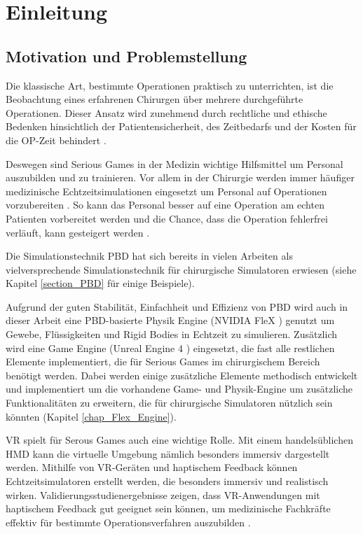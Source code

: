 \chapter{Einleitung}
\label{chap_Einleitung}



\section{Motivation und Problemstellung}


Die klassische Art, bestimmte Operationen praktisch zu unterrichten, ist die Beobachtung eines erfahrenen Chirurgen über mehrere durchgeführte Operationen. Dieser Ansatz wird zunehmend durch rechtliche und ethische Bedenken hinsichtlich der Patientensicherheit, des Zeitbedarfs und der Kosten für die OP-Zeit behindert \cite{SurgSim}.

Deswegen sind Serious Games in der Medizin wichtige Hilfsmittel um Personal auszubilden und zu trainieren. Vor allem in der Chirurgie werden immer häufiger medizinische Echtzeitsimulationen eingesetzt um Personal auf Operationen vorzubereiten \cite{SimRole}. So kann das Personal besser auf eine Operation am echten Patienten vorbereitet werden und die Chance, dass die Operation fehlerfrei verläuft, kann gesteigert werden \cite{VRNeuro}.

Die Simulationstechnik \ac{PBD} \cite{PBD} hat sich bereits in vielen Arbeiten als vielversprechende Simulationstechnik für chirurgische Simulatoren erwiesen (siehe Kapitel \ref{section_PBD} für einige Beispiele). 

Aufgrund der guten Stabilität, Einfachheit und Effizienz von PBD wird auch in dieser Arbeit eine PBD-basierte Physik Engine (NVIDIA FleX \cite{UPP}) genutzt um Gewebe, Flüssigkeiten und Rigid Bodies in Echtzeit zu simulieren. Zusätzlich wird eine Game Engine (Unreal Engine 4 \cite{UE4FlexDoc}) eingesetzt, die fast alle restlichen Elemente implementiert, die für Serious Games im chirurgischem Bereich benötigt werden. Dabei werden einige zusätzliche Elemente methodisch entwickelt und implementiert um die vorhandene Game- und Physik-Engine um zusätzliche Funktionalitäten zu erweitern, die für chirurgische Simulatoren nützlich sein könnten (Kapitel \ref{chap_Flex_Engine}).

\ac{VR} spielt für Serous Games auch eine wichtige Rolle. Mit einem handelsüblichen \ac{HMD} kann die virtuelle Umgebung nämlich besonders immersiv dargestellt werden.
Mithilfe von VR-Geräten und haptischem Feedback können Echtzeitsimulatoren erstellt werden, die besonders immersiv und realistisch wirken. Validierungsstudienergebnisse zeigen, dass VR-Anwendungen mit haptischem Feedback gut geeignet sein können, um medizinische Fachkräfte effektiv für bestimmte Operationsverfahren auszubilden \cite{VRSim20}.

